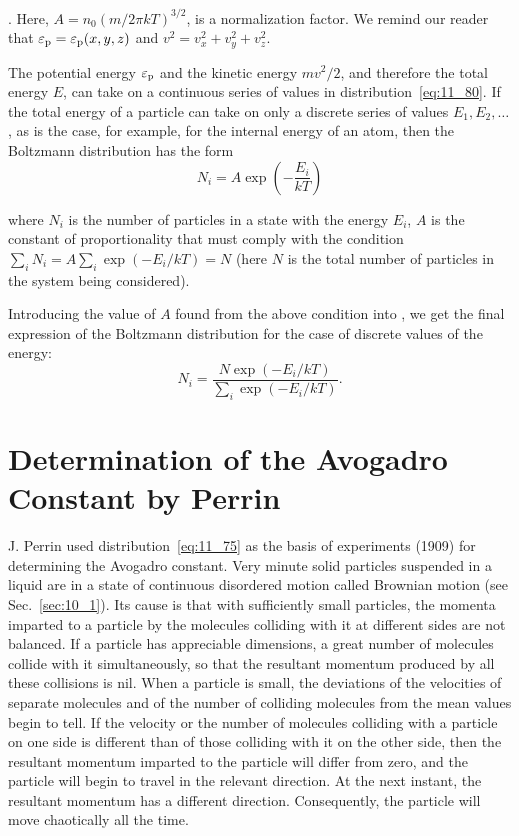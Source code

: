 . Here, $A=n_0(m/2\pi kT)^{3/2}$, is a normalization factor. We remind our reader that $\varepsilon_{\text{p}}=\varepsilon_{\text{p}}(x,y,z)$ and $v^2=v_x^2+v_y^2+v_z^2$.

The potential energy $\varepsilon_{\text{p}}$ and the kinetic energy $mv^2/2$, and therefore the total energy $E$, can take on a continuous series of values in distribution~\eqref{eq:11_80}. If the total energy of a particle can take on only a discrete series of values $E_1, E_2,\ldots$, as is the case, for example, for the internal energy of an atom, then the Boltzmann distribution has the form
\begin{equation}\label{eq:11_81}
	N_i = A \exp\left(-\frac{E_i}{kT}\right)
\end{equation}

\noindent
where $N_i$ is the number of particles in a state with the energy $E_i$, $A$ is the constant of proportionality that must comply with the condition $\sum_i N_i=A\sum_i\exp(-E_i/kT)=N$ (here $N$ is the total number of particles in the system being considered).

Introducing the value of $A$ found from the above condition into , we get the final expression of the Boltzmann distribution for the case of discrete values of the energy:
\begin{equation}\label{eq:11_82}
	N_i = \frac{N \exp(-E_i/kT)}{\displaystyle\sum_i\exp(-E_i/kT)}.
\end{equation}

\section{Determination of the Avogadro Constant	by Perrin}\label{sec:11_9}

J. Perrin used distribution~\eqref{eq:11_75} as the basis of experiments (1909) for determining the Avogadro constant. Very minute solid particles suspended in a liquid are in a state of continuous disordered motion called Brownian motion (see Sec.~\ref{sec:10_1}). Its cause is that with sufficiently small particles, the momenta imparted to a particle by the molecules colliding with it at different sides are not balanced. If a particle has appreciable dimensions, a great number of molecules collide with it simultaneously, so that the resultant momentum produced by all these collisions is nil. When a particle is small, the deviations of the velocities of separate molecules and of the number of colliding molecules from the mean values begin to tell. If the velocity or the number of molecules colliding with a particle on one side is different than of those colliding with it on the other side, then the resultant momentum imparted to the particle will differ from zero, and the particle will begin to travel in the relevant direction. At the next instant, the resultant momentum has a different direction. Consequently, the particle will move chaotically all the time.

